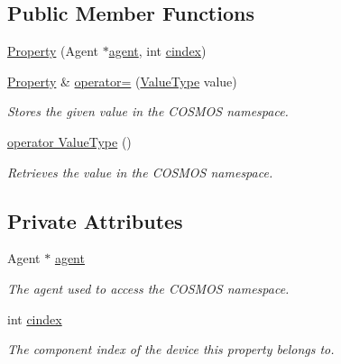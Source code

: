 \subsection*{Public Member Functions}
\begin{DoxyCompactItemize}
\item 
\hyperlink{structcubesat_1_1Property_a12f691402fdf35461ddad1c88a6142d8}{Property} (Agent $\ast$\hyperlink{structcubesat_1_1Property_a04415356b5a01900753d1fb26987ace8}{agent}, int \hyperlink{structcubesat_1_1Property_a69c661b3e78deee31af23956fc6130c5}{cindex})
\item 
\hyperlink{structcubesat_1_1Property}{Property} \& \hyperlink{structcubesat_1_1Property_a5aa93e37bf7adaa56ac3a9fba407e12c}{operator=} (\hyperlink{structcubesat_1_1Property_a24aaec6241faac15f50c63bb6c972fd4}{Value\+Type} value)
\begin{DoxyCompactList}\small\item\em Stores the given value in the C\+O\+S\+M\+OS namespace. \end{DoxyCompactList}\item 
\hyperlink{structcubesat_1_1Property_ac8aa543ac4a3ea760a2291ad408b34ff}{operator Value\+Type} ()
\begin{DoxyCompactList}\small\item\em Retrieves the value in the C\+O\+S\+M\+OS namespace. \end{DoxyCompactList}\end{DoxyCompactItemize}
\subsection*{Private Attributes}
\begin{DoxyCompactItemize}
\item 
Agent $\ast$ \hyperlink{structcubesat_1_1Property_a04415356b5a01900753d1fb26987ace8}{agent}
\begin{DoxyCompactList}\small\item\em The agent used to access the C\+O\+S\+M\+OS namespace. \end{DoxyCompactList}\item 
int \hyperlink{structcubesat_1_1Property_a69c661b3e78deee31af23956fc6130c5}{cindex}
\begin{DoxyCompactList}\small\item\em The component index of the device this property belongs to. \end{DoxyCompactList}\end{DoxyCompactItemize}


